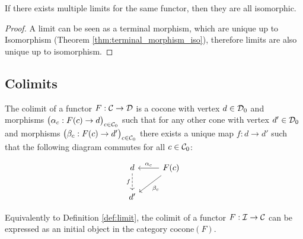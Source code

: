 \begin{theorem}
	If there exists multiple limits for the same functor, then they are all
	isomorphic.

	\begin{proof}
		A limit can be seen as a terminal morphism, which are unique up to
		Isomorphism (Theorem \ref{thm:terminal_morphism_iso}), therefore limits are
		also unique up to isomorphism.
	\end{proof}
\end{theorem}

\subsection{Colimits}

\begin{definition}
	The colimit of a functor $F:\mathcal{C}\to \mathcal{D}$ is a cocone with vertex $d\in \mathcal{D}_0$ and
	morphisms $\big(\alpha_c: F(c)\to d\big)_{c\in \mathcal{C}_0}$ such that for any other
	cone with vertex $d'\in \mathcal{D}_0$ and morphisms $\big(\beta_c: F(c)\to
	d'\big)_{c\in \mathcal{C}_0}$ there exists a unique map $f:d\to d'$ such that the
	following diagram commutes for all $c\in \mathcal{C}_0$:
	\parencite{leinster:basic_category_theory}

	\[\begin{tikzcd}[ampersand replacement=\&]
		d \& {F(c)} \\
		{d'}
		\arrow["{\alpha_c}"', from=1-2, to=1-1]
		\arrow["{\beta_c}", from=1-2, to=2-1]
		\arrow["f"', dashed, from=1-1, to=2-1]
	\end{tikzcd}\]
\end{definition}

\begin{definition}
	Equivalently to Definition \ref{def:limit}, the colimit of a functor $F:\mathcal{I}\to
	\mathcal{C}$ can be expressed as an initial object in the category
	$\mathrm{cocone}(F)$.
\end{definition}


